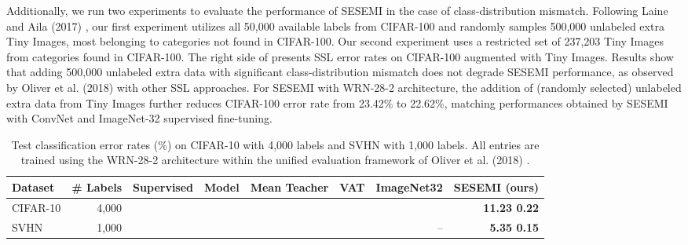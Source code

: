 \documentclass{article}
\begin{document}
Additionally, we run two experiments to evaluate the performance of SESEMI in the case of class-distribution mismatch. Following Laine and Aila (2017) \cite{tempens}, our first experiment utilizes all 50,000 available labels from CIFAR-100 and randomly samples 500,000 unlabeled extra Tiny Images, most belonging to categories not found in CIFAR-100. Our second experiment uses a restricted set of 237,203 Tiny Images from categories found in CIFAR-100. The right side of  presents SSL error rates on CIFAR-100 augmented with Tiny Images. Results show that adding 500,000 unlabeled extra data with significant class-distribution mismatch does not degrade SESEMI performance, as observed by Oliver et al. (2018) \cite{ssl-eval} with other SSL approaches. For SESEMI with WRN-28-2 architecture, the addition of (randomly selected) unlabeled extra data from Tiny Images further reduces CIFAR-100 error rate from 23.42\% to 22.62\%, matching performances obtained by SESEMI with ConvNet and ImageNet-32 supervised fine-tuning.

\begin{table}[t]
{\caption{Test classification error rates (\%) on CIFAR-10 with 4,000 labels and SVHN with 1,000 labels. All entries are trained using the WRN-28-2 architecture within the unified evaluation framework of Oliver et al. (2018) \cite{ssl-eval}.}\label{table3}}
\begin{center}
\begin{adjustbox}{width=\textwidth}
	\begin{tabular} {lrrrrrrr}
	\toprule
	\multicolumn{1}{l}{\multirow{1}{*}{Dataset}} &
	\multicolumn{1}{l}{\multirow{1}{*}{\# Labels}} &
	\multicolumn{1}{c}{\multirow{1}{*}{Supervised}} &
    \multicolumn{1}{c}{\multirow{1}{*}{ Model}} &
	\multicolumn{1}{c}{\multirow{1}{*}{Mean Teacher}} &
	\multicolumn{1}{c}{\multirow{1}{*}{VAT}} & 
	\multicolumn{1}{c}{\multirow{1}{*}{ImageNet32}} & 
	\multicolumn{1}{c}{\multirow{1}{*}{SESEMI (ours)}} \\
    \midrule \midrule
    CIFAR-10
				& 4,000
				& 
                & 
				& 
				& 
				& 
				& \bfseries 11.23  0.22 \\
    SVHN
				& 1,000
				& 
                & 
				& 
				& 
				& --
				& \bfseries 5.35  0.15 \\
    \bottomrule
	\end{tabular}
\end{adjustbox}
\end{center}
\end{table}
\end{document}
